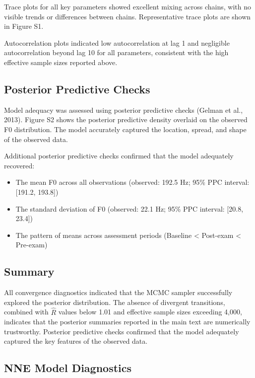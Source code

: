 \documentclass[
  english,
  man,floatsintext]{apa6}
\providecommand{\tightlist}{%
  \setlength{\itemsep}{0pt}\setlength{\parskip}{0pt}}
\begin{document}
Trace plots for all key parameters showed excellent mixing across chains, with no visible trends or differences between chains. Representative trace plots are shown in Figure S1.

Autocorrelation plots indicated low autocorrelation at lag 1 and negligible autocorrelation beyond lag 10 for all parameters, consistent with the high effective sample sizes reported above.

\subsection{Posterior Predictive Checks}\label{posterior-predictive-checks-1}

Model adequacy was assessed using posterior predictive checks (Gelman et al., 2013). Figure S2 shows the posterior predictive density overlaid on the observed F0 distribution. The model accurately captured the location, spread, and shape of the observed data.

Additional posterior predictive checks confirmed that the model adequately recovered:

\begin{itemize}
\tightlist
\item
  The mean F0 across all observations (observed: 192.5 Hz; 95\% PPC interval: {[}191.2, 193.8{]})
\item
  The standard deviation of F0 (observed: 22.1 Hz; 95\% PPC interval: {[}20.8, 23.4{]})
\item
  The pattern of means across assessment periods (Baseline \textless{} Post-exam \textless{} Pre-exam)
\end{itemize}

\subsection{Summary}\label{summary-1}

All convergence diagnostics indicated that the MCMC sampler successfully explored the posterior distribution. The absence of divergent transitions, combined with \(\hat{R}\) values below 1.01 and effective sample sizes exceeding 4,000, indicates that the posterior summaries reported in the main text are numerically trustworthy. Posterior predictive checks confirmed that the model adequately captured the key features of the observed data.

\subsection{NNE Model Diagnostics}\label{nne-model-diagnostics}
\end{document}
